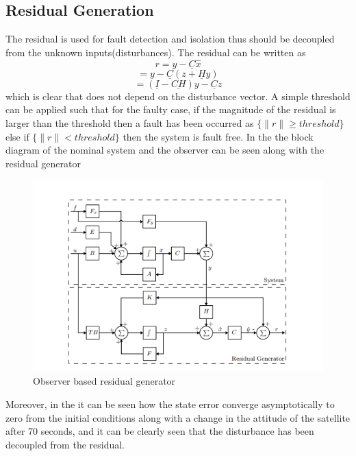   \subsection{Residual Generation}
  The residual is used for fault detection and isolation thus should be decoupled from the unknown inputs(disturbances). The residual can be written as
   \begin{equation*}
   r = y - \underline C \hat{x} 
   \label{errordynamics11}
   \end{equation*}
\begin{equation*}
	 = y - \underline C (z + \underline{H} y ) 
	\label{errordynamics12}
\end{equation*}
\begin{equation*}
	= (\underline I  -\underline{ CH})y   -\underline C z 
	\label{errordynamics13}
\end{equation*}
which is clear that does not depend on the disturbance vector. A simple threshold can be applied such that for the faulty case, if the magnitude of the residual is larger than the threshold then a fault has been occurred as
$\{\lVert r\rVert \geq threshold \}$ else if $\{\lVert r\rVert < threshold \}$ then the system is fault free. In the  the block diagram of the nominal system and the observer can be seen along with the residual generator
\begin{figure}[H]
	\centering
	\includegraphics[width=0.7\linewidth]{figures/observer}
	\caption{Observer based residual generator}
	\label{fig:residualobs}
\end{figure}
Moreover, in the  it can be seen how the state error converge asymptotically to zero from the initial conditions along with a change in the attitude of the satellite after 70 seconds, and it can be clearly seen that the disturbance has been decoupled from the residual.
